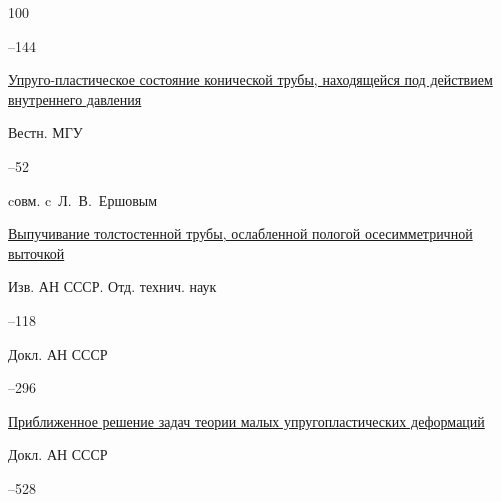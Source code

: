 \begin{thebibliography}{100}

–144




\paper \href{https://zbmath.org/?q=an:0078.38905}{Упруго-пластическое состояние конической трубы, находящейся под действием внутреннего давления}

\jour Вестн. МГУ



–52 

\miscnote cовм. c~Л.~В.~Ершовым







\paper \href{https://zbmath.org/?q=an:0090.15404}{Выпучивание толстостенной трубы, ослабленной пологой осесимметричной выточкой}

\jour Изв. АН СССР. Отд. технич. наук



–118





\paper {}

\jour Докл. АН СССР




–296





\paper \href{https://zbmath.org/?q=an:0089.42102}{Приближенное решение задач теории малых упругопластических деформаций}

\jour Докл. АН СССР




–528





\end{thebibliography}
